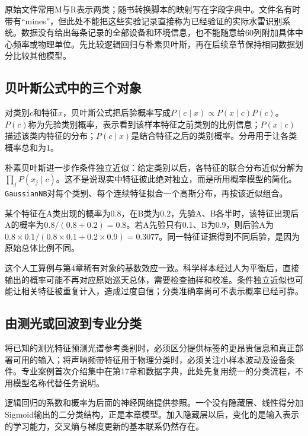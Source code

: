 原始文件常用M与R表示两类；随书转换脚本的映射写在字段字典中。文件名有时带有“mines”，但此处不能把这些实验记录直接称为已经验证的实际水雷识别系统。数据没有给出每条记录的全部设备和环境信息，也不能随意给60列附加具体中心频率或物理单位。先比较逻辑回归与朴素贝叶斯，再在后续章节保持相同数据划分比较其他模型。


\subsection{贝叶斯公式中的三个对象}
对类别$c$和特征$x$，贝叶斯公式把后验概率写成$P(c\mid x)\propto P(x\mid c)P(c)$。$P(c)$称为先验类别概率，表示看到该样本特征之前类别的比例信息；$P(x\mid c)$描述该类内特征的分布；$P(c\mid x)$是结合特征之后的类别概率。分母用于让各类概率总和为1。

朴素贝叶斯进一步作条件独立近似：给定类别以后，各特征的联合分布近似分解为$\prod_jP(x_j\mid c)$。这不是说现实中特征彼此绝对独立，而是所用概率模型的简化。\texttt{GaussianNB}对每个类别、每个连续特征拟合一个高斯分布，再按该近似组合。

某个特征在A类出现的概率为0.8，在B类为0.2，先验A、B各半时，该特征出现后A的概率为$0.8/(0.8+0.2)=0.8$。若A先验只有0.1、B为0.9，则后验A为$0.8\times0.1/(0.8\times0.1+0.2\times0.9)=0.3077$。同一特征证据得到不同后验，是因为原始总体比例不同。

这个人工算例与第4章稀有对象的基数效应一致。科学样本经过人为平衡后，直接输出的概率可能不再对应原始巡天总体，需要检查抽样和校准。条件独立近似也可能让相关特征被重复计入，造成过度自信；分类准确率尚可不表示概率已经可靠。

\subsection{由测光或回波到专业分类}
将已知的测光特征预测光谱参考类别时，必须区分提供标签的更昂贵信息和真正部署可用的输入；将声呐频带特征用于物理分类时，必须关注小样本波动及设备条件。专业案例首次介绍集中在第17章和数据字典，此处先复用统一的分类流程，不用模型名称代替任务说明。

逻辑回归的系数和概率为后面的神经网络提供参照。一个没有隐藏层、线性得分加Sigmoid输出的二分类结构，正是本章模型。加入隐藏层以后，变化的是输入表示的学习能力，交叉熵与梯度更新的基本联系仍然存在。

